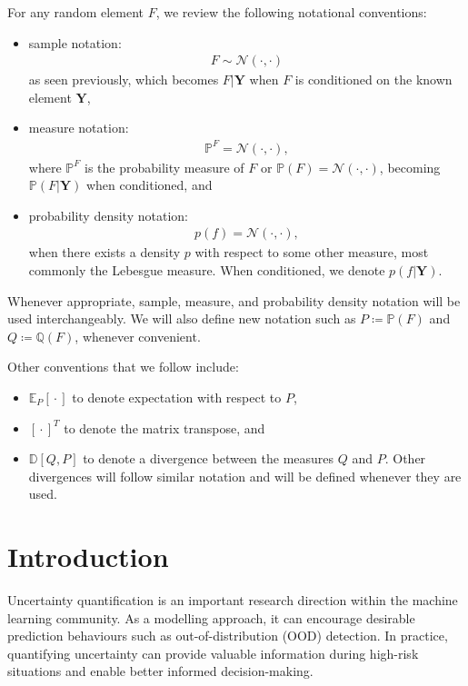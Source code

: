 \documentclass{article}
\newcommand{\wc}{\operatorname{{}\cdot{}}}
\numberwithin{equation}{section}
\begin{document}
For any random element $F$, we review the following notational conventions:
\begin{itemize}
    \setlength\itemsep{-0.25em}
    \item sample notation: 
        \begin{align}
            F \sim \mathcal{N}(\cdot, \cdot)
        \end{align}
        as seen previously, which becomes $F \vert \mathbf{Y}$ when $F$ is conditioned on the known element $\mathbf{Y}$,
    \item measure notation: 
        \begin{align}
            \mathbb{P}^F = \mathcal{N}(\cdot, \cdot),
        \end{align}
        where $\mathbb{P}^F$ is the probability measure of $F$ or $\mathbb{P}(F) = \mathcal{N}(\cdot, \cdot)$, becoming $\mathbb{P}(F \vert \mathbf{Y})$ when conditioned, and
    \item probability density notation: 
        \begin{align}
           p(f) = \mathcal{N}(\cdot, \cdot),
        \end{align}
        when there exists a density $p$ with respect to some other measure, most commonly the Lebesgue measure. 
        When conditioned, we denote $p(f\vert \mathbf{Y})$.
\end{itemize}
Whenever appropriate, sample, measure, and probability density notation will be used interchangeably. 
We will also define new notation such as $P \coloneqq \mathbb{P}(F)$ and $Q \coloneqq \mathbb{Q}(F)$, whenever convenient.

Other conventions that we follow include:
\begin{itemize}
    \setlength\itemsep{-0.25em}
    \item $\mathbb{E}_{P}[\wc]$ to denote expectation with respect to $P$,
    \item $\left[\wc\right]^T$ to denote the matrix transpose, and 
    \item $\mathbb{D}[Q, P]$ to denote a divergence between the measures $Q$ and $P$. Other divergences will follow similar notation and will be defined whenever they are used.
\end{itemize}
 

\newpage
\section{Introduction}
Uncertainty quantification is an important research direction within the machine learning community.
As a modelling approach, it can encourage desirable prediction behaviours such as out-of-distribution (OOD) detection. 
In practice, quantifying uncertainty can provide valuable information during high-risk situations and enable better informed decision-making.
\end{document}
